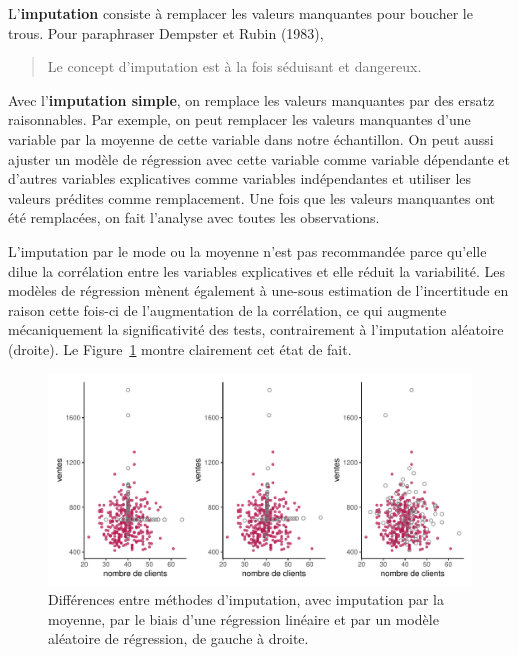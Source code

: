 \documentclass[
  11pt,
  letterpaper,
]{scrbook}
\theoremstyle{definition}
\theoremstyle{remark}
\begin{document}
L'\textbf{imputation} consiste à remplacer les valeurs manquantes pour
boucher le trous. Pour paraphraser Dempster et Rubin (1983),

\begin{quote}
Le concept d'imputation est à la fois séduisant et dangereux.
\end{quote}

Avec l'\textbf{imputation simple}, on remplace les valeurs manquantes
par des ersatz raisonnables. Par exemple, on peut remplacer les valeurs
manquantes d'une variable par la moyenne de cette variable dans notre
échantillon. On peut aussi ajuster un modèle de régression avec cette
variable comme variable dépendante et d'autres variables explicatives
comme variables indépendantes et utiliser les valeurs prédites comme
remplacement. Une fois que les valeurs manquantes ont été remplacées, on
fait l'analyse avec toutes les observations.

L'imputation par le mode ou la moyenne n'est pas recommandée parce
qu'elle dilue la corrélation entre les variables explicatives et elle
réduit la variabilité. Les modèles de régression mènent également à
une-sous estimation de l'incertitude en raison cette fois-ci de
l'augmentation de la corrélation, ce qui augmente mécaniquement la
significativité des tests, contrairement à l'imputation aléatoire
(droite). Le Figure~\ref{fig-imputation} montre clairement cet état de
fait.

\begin{figure}[ht!]

{\centering \includegraphics[width=1\textwidth,height=\textheight]{donneesmanquantes_files/figure-pdf/fig-imputation-1.pdf}

}

\caption{\label{fig-imputation}Différences entre méthodes d'imputation,
avec imputation par la moyenne, par le biais d'une régression linéaire
et par un modèle aléatoire de régression, de gauche à droite.}

\end{figure}
\end{document}
